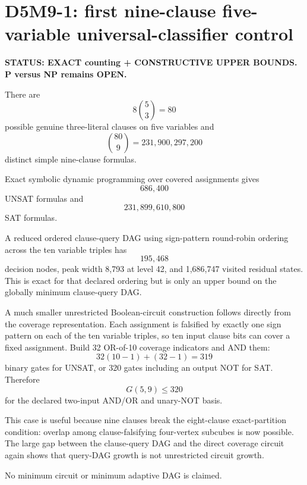 \section*{D5M9-1: first nine-clause five-variable universal-classifier control}

\textbf{STATUS: EXACT counting + CONSTRUCTIVE UPPER BOUNDS. P versus NP remains OPEN.}

There are
\[
8\binom53=80
\]
possible genuine three-literal clauses on five variables and
\[
\binom{80}{9}=231{,}900{,}297{,}200
\]
distinct simple nine-clause formulas.

Exact symbolic dynamic programming over covered assignments gives
\[
\boxed{686{,}400}
\]
UNSAT formulas and
\[
231{,}899{,}610{,}800
\]
SAT formulas.

A reduced ordered clause-query DAG using sign-pattern round-robin ordering across
the ten variable triples has
\[
\boxed{195{,}468}
\]
decision nodes, peak width 8,793 at level 42, and 1,686,747 visited residual
states. This is exact for that declared ordering but is only an upper bound on
the globally minimum clause-query DAG.

A much smaller unrestricted Boolean-circuit construction follows directly from
the coverage representation. Each assignment is falsified by exactly one sign
pattern on each of the ten variable triples, so ten input clause bits can cover
a fixed assignment. Build 32 OR-of-10 coverage indicators and AND them:
\[
32(10-1)+(32-1)=319
\]
binary gates for UNSAT, or 320 gates including an output NOT for SAT. Therefore
\[
G(5,9)\le320
\]
for the declared two-input AND/OR and unary-NOT basis.

This case is useful because nine clauses break the eight-clause exact-partition
condition: overlap among clause-falsifying four-vertex subcubes is now possible.
The large gap between the clause-query DAG and the direct coverage circuit again
shows that query-DAG growth is not unrestricted circuit growth.

No minimum circuit or minimum adaptive DAG is claimed.

